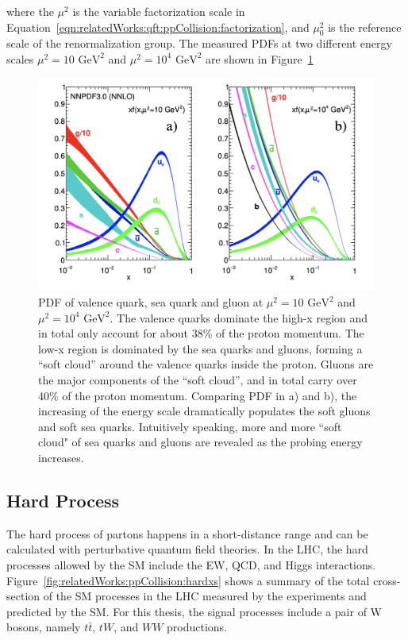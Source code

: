 \noindent where the $\mu^2$ is the variable factorization scale in Equation~\ref{eqn:relatedWorks:qft:ppCollision:factorization}, and $\mu^2_0$ is the reference scale of the renormalization group. The measured PDFs at two different energy scales  $\mu^2=10 \text{ GeV}^2$ and $\mu^2=10^4 \text{ GeV}^2$ are shown in Figure~\ref{fig:relatedWorks:ppCollision:pdf}


\begin{figure}[ht]
    \centering
    \includegraphics[width = 0.7 \textwidth]{chapters/RelatedWorks/sectionPPCollision/figures/pdf.png}
    \caption{PDF of valence quark, sea quark and gluon at $\mu^2=10 \text{ GeV}^2$ and $\mu^2=10^4 \text{ GeV}^2$. The valence quarks dominate the high-x region and in total only account for about 38\% of the proton momentum. The low-x region is dominated by the sea quarks and gluons, forming a ``soft cloud'' around the valence quarks inside the proton. Gluons are the major components of the ``soft cloud'', and in total carry over 40\% of the proton momentum. Comparing PDF in a) and b), the increasing of the energy scale dramatically populates the soft gluons and soft sea quarks.  Intuitively speaking, more and more ``soft cloud" of sea quarks and gluons are revealed as the probing energy increases.}
    \label{fig:relatedWorks:ppCollision:pdf}
\end{figure}



\subsection{Hard Process}
\label{sec:relatedWorks:ppCollision:hardProcess} 


The hard process of partons happens in a short-distance range and can be calculated with perturbative quantum field theories. In the LHC, the hard processes allowed by the SM include the EW, QCD, and Higgs interactions. Figure~\ref{fig:relatedWorks:ppCollision:hardxs} shows a summary of the total cross-section of the SM processes in the LHC measured by the experiments and predicted by the SM. For this thesis, the signal processes include a pair of W bosons, namely $t\bar{t}$, $tW$, and $WW$ productions.




